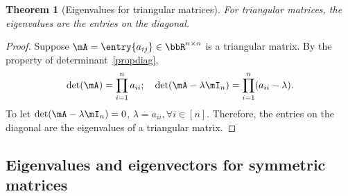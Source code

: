 \documentclass[11pt]{article}
\theoremstyle{plain}
\newtheorem{thm}{Theorem}[section]
\theoremstyle{definition}
\begin{document}
\begin{thm}[Eigenvalues for triangular matrices]\label{thm:trianeigen}
	For triangular matrices, the eigenvalues are the entries on the diagonal.
\end{thm}

\begin{proof}
Suppose $\mA = \entry{a_{ij}} \in \bbR^{n \times n}$ is a triangular matrix. By the property of determinant~\ref{propdiag}, 
\[ \det(\mA) = \prod_{i=1}^n a_{ii}  ; \quad \det(\mA - \lambda \mI_n) = \prod_{i=1}^n (a_{ii}-\lambda). \]
To let $\det(\mA - \lambda \mI_n) = 0$, $\lambda = a_{ii}, \forall i\in[n]$. Therefore, the entries on the diagonal are the eigenvalues of a triangular matrix.
\end{proof}


\subsection{Eigenvalues and eigenvectors for symmetric matrices}
\end{document}
